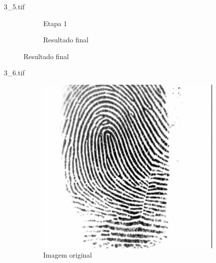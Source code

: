\documentclass{beamer}
\begin{document}
\begin{frame}{3\_5.tif}
\begin{figure}
\begin{subfigure}[!ht]{0.32\textwidth}
                \caption{Etapa 1}
            \end{subfigure}
            \begin{subfigure}[!ht]{0.32\textwidth}
                \caption{Resultado final}
            \end{subfigure}
        \end{figure}
    \end{frame}

    \begin{frame}{3\_6.tif}
        \begin{figure}
            \centering
            \begin{subfigure}[!ht]{0.32\textwidth}
                \includegraphics[width=\columnwidth]{Fingerprints/3_6.jpg}
                \caption{Imagem original}
            \end{subfigure}
            \begin{subfigure}[!ht]{0.32\textwidth}

\end{subfigure}
\end{figure}
\end{frame}
\end{document}
